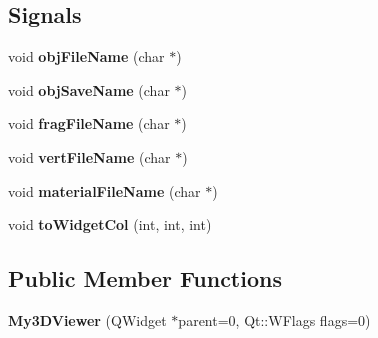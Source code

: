 \subsection*{Signals}
\begin{DoxyCompactItemize}
\item 
\hypertarget{class_my3_d_viewer_a408f9fd45cb330b249ba4ab4bd9932e1}{void {\bfseries obj\-File\-Name} (char $\ast$)}\label{class_my3_d_viewer_a408f9fd45cb330b249ba4ab4bd9932e1}

\item 
\hypertarget{class_my3_d_viewer_a61fb6e0766e3b5d657d6b4100a906b97}{void {\bfseries obj\-Save\-Name} (char $\ast$)}\label{class_my3_d_viewer_a61fb6e0766e3b5d657d6b4100a906b97}

\item 
\hypertarget{class_my3_d_viewer_a38bdab58c7eefa8a0b6d9c46f61aa991}{void {\bfseries frag\-File\-Name} (char $\ast$)}\label{class_my3_d_viewer_a38bdab58c7eefa8a0b6d9c46f61aa991}

\item 
\hypertarget{class_my3_d_viewer_a2e9a2ed9db1ff4462eef50bb202ac278}{void {\bfseries vert\-File\-Name} (char $\ast$)}\label{class_my3_d_viewer_a2e9a2ed9db1ff4462eef50bb202ac278}

\item 
\hypertarget{class_my3_d_viewer_af7927e1aa2363d8e13e3ecd44395e868}{void {\bfseries material\-File\-Name} (char $\ast$)}\label{class_my3_d_viewer_af7927e1aa2363d8e13e3ecd44395e868}

\item 
\hypertarget{class_my3_d_viewer_a3a3b719e90b208b12c416caadb7a7fd8}{void {\bfseries to\-Widget\-Col} (int, int, int)}\label{class_my3_d_viewer_a3a3b719e90b208b12c416caadb7a7fd8}

\end{DoxyCompactItemize}
\subsection*{Public Member Functions}
\begin{DoxyCompactItemize}
\item 
\hypertarget{class_my3_d_viewer_a02194ec10a01355928b1fcb7e35a4913}{{\bfseries My3\-D\-Viewer} (Q\-Widget $\ast$parent=0, Qt\-::\-W\-Flags flags=0)}\label{class_my3_d_viewer_a02194ec10a01355928b1fcb7e35a4913}

\end{DoxyCompactItemize}
